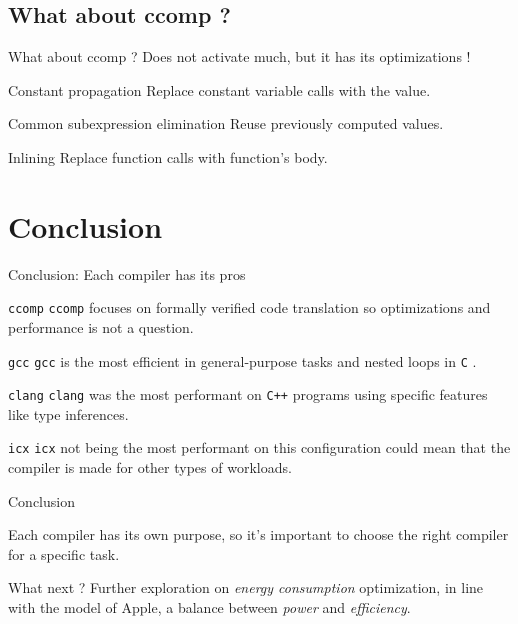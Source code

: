 \documentclass{beamer}
\newcommand{\gcc}{\texttt{gcc} }
\newcommand{\icx}{\texttt{icx} }
\newcommand{\clang}{\texttt{clang} }
\newcommand{\comp}{\texttt{ccomp} }
\newcommand{\clgg}{\texttt{C} }
\newcommand{\cpp}{\texttt{C++} }
\begin{document}
    
    \subsection{What about ccomp ?}

    \begin{frame}[<+->]{What about ccomp ?}
        Does not activate much, but it has its optimizations !
        \begin{block}{Constant propagation}
            Replace constant variable calls with the value.
        \end{block}
        \begin{block}{Common subexpression elimination}
            Reuse previously computed values.
        \end{block}
        \begin{block}{Inlining}
            Replace function calls with function's body.
        \end{block}
    \end{frame}
    
    \section{Conclusion}

    \begin{frame}{Conclusion: Each compiler has its pros}
        \begin{block}{\comp}
            \comp focuses on formally verified code translation so optimizations and performance is not a question.
        \end{block}
        \begin{block}{\gcc}
            \gcc is the most efficient in general-purpose tasks and nested loops in \clgg.
        \end{block}
        \begin{block}{\clang}
            \clang was the most performant on \cpp programs using specific features like type inferences.
        \end{block}
        \begin{block}{\icx}
            \icx not being the most performant on this configuration could mean that the compiler is made for other types of workloads.
        \end{block}
    \end{frame}

    \begin{frame}{Conclusion}
        \begin{block}{}
            Each compiler has its own purpose, so it's important to choose the right compiler for a specific task.
        \end{block}
        \begin{block}{What next ?}
            Further exploration on \textit{energy consumption} optimization, in line with the model of Apple, a balance between \textit{power} and \textit{efficiency}.
        \end{block}
    \end{frame}
    
\end{document}
